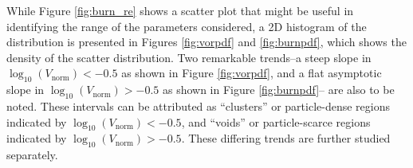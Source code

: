 \documentclass[times,twocolumn,final]{elsarticle}
\newcommand{\mrm}[1]{\mathrm{#1}}
\begin{document}
While Figure \ref{fig:burn_re} shows a scatter plot that might be useful in identifying the range of the parameters considered, a 2D histogram of the distribution is presented in Figures \ref{fig:vorpdf} and \ref{fig:burnpdf}, which shows the density of the scatter distribution. Two remarkable trends--a steep slope in $\log_{10}\left(V_\mrm{norm}\right) < -0.5$ as shown in Figure \ref{fig:vorpdf}, and a flat asymptotic slope in $\log_{10}\left(V_\mrm{norm}\right) > -0.5$ as shown in Figure \ref{fig:burnpdf}-- are also to be noted. These intervals can be attributed as ``clusters'' or particle-dense regions indicated by $\log_{10}\left(V_\mrm{norm}\right) < -0.5$, and ``voids'' or particle-scarce regions indicated by $\log_{10}\left(V_\mrm{norm}\right) > -0.5$. These differing trends are further studied separately.
\end{document}
